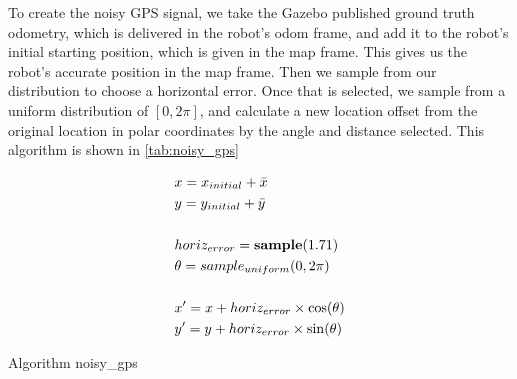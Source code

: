 \documentclass[thesis.tex]{subfile}
\begin{document}
To create the noisy GPS signal, we take the Gazebo published ground truth odometry, which is delivered in the robot's odom frame, and add it to the robot's initial starting position, which is given in the map frame. This gives us the robot's accurate position in the map frame. Then we sample from our distribution to choose a horizontal error. Once that is selected, we sample from a uniform distribution of $[0, 2\pi]$, and calculate a new location offset from the original location in polar coordinates by the angle and distance selected. This algorithm is shown in \autoref{tab:noisy_gps}

\begin{table}
\centering
\begin{align}
&x = x_{initial} + \bar{x}\\
&y = y_{initial} + \bar{y}\\
\notag \\
&horiz_{error} = \textbf{sample}(1.71)\\
&\theta = \textbf{$sample_{uniform}$}(0, 2\pi)\\
\notag \\
&x' = x + horiz_{error} \times \cos(\theta)\\
&y' = y + horiz_{error} \times \sin(\theta)
\end{align}
\caption{Algorithm noisy\_gps}
\label{tab:noisy_gps}
\end{table}
\end{document}
